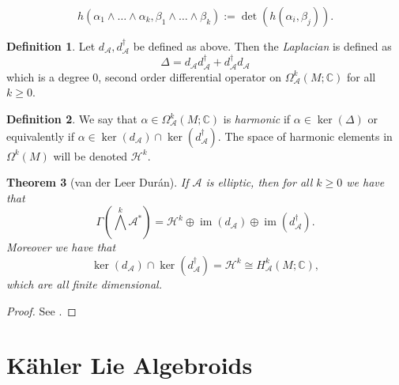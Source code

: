 \documentclass{amsart}
\newcommand{\C}{\mathbb{C}}
\newtheorem{theorem}{Theorem}
\theoremstyle{definition}
\newtheorem{definition}[theorem]{Definition}
\newcommand{\A}{\mathcal{A}}
\theoremstyle{definition}
\DeclareMathOperator{\im}{im}
\begin{document}
\begin{equation*}
    h(\alpha_1 \wedge \dots \wedge \alpha_k, \beta_1 \wedge \dots \wedge \beta_k) := \det(h(\alpha_i,\beta_j)).
\end{equation*}
\begin{definition}
    Let $d_\A,d_\A^\dagger$ be defined as above. Then the \textit{Laplacian} is defined as
    \begin{equation*}
        \Delta = d_\A d_\A^\dagger + d_\A ^\dagger d_\A
    \end{equation*}
    which is a degree 0, second order differential operator on $\Omega_\A^k(M;\C)$ for all $k \geq 0$.
\end{definition}
\begin{definition}
    We say that $\alpha \in \Omega_\A^k(M;\C)$ is \textit{harmonic} if $\alpha \in \ker(\Delta)$ or equivalently if $\alpha \in \ker(d_\A) \cap \ker(d_\A^\dagger)$. The space of harmonic elements in $\Omega^k(M)$ will be denoted $\mathcal{H}^k$.
\end{definition}

\begin{theorem}[van der Leer Dur\'an]\label{HodgeDecomp}
    If $\A$ is elliptic, then for all $k \geq 0$  we have that
    \begin{equation*}
        \Gamma( \bigwedge^k \A^*) = \mathcal{H}^k \oplus \im(d_\A) \oplus \im(d_\A^\dagger).
    \end{equation*}
    Moreover we have that
    \begin{equation*}
        \ker(d_\A) \cap \ker(d_\A^\dagger)=\mathcal{H}^k \cong H^k_\A(M;\C),
    \end{equation*}
    which are all finite dimensional.
\end{theorem}
\begin{proof}
    See \cite[Theorem 1.45]{MR4377306}.
\end{proof}

\section{Kähler Lie Algebroids}
\end{document}
